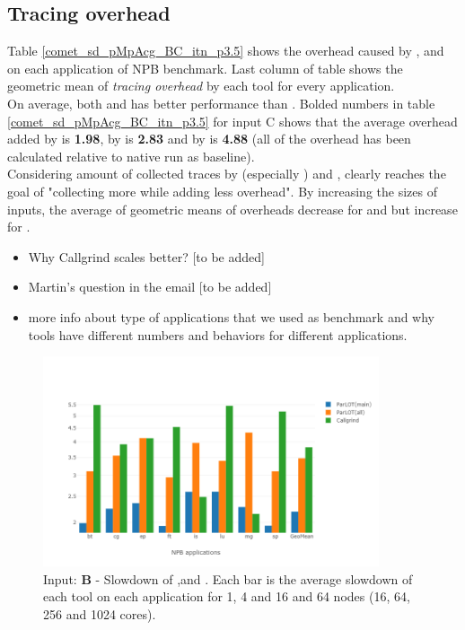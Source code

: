 

\subsection{Tracing overhead}
\label{subsec:lowtoh}

 

   
Table \ref{comet_sd_pMpAcg_BC_itn_p3.5} shows the overhead caused by \parlotm, \parlota and  \callgrind on each application of NPB benchmark.
Last column of table shows the geometric mean of \textit{tracing overhead} by each tool for every application. \\
 
 

On average, both \parlotm and \parlota has better performance than \callgrind. Bolded numbers in table \ref{comet_sd_pMpAcg_BC_itn_p3.5} for input C shows that the average overhead added by \parlotm is \textbf{1.98}, by \parlota is \textbf{2.83} and by \callgrind is \textbf{4.88} (all of the overhead has been calculated relative to native run as baseline). 
\\
Considering amount of collected traces by \parlot (especially \parlota) and \callgrind, clearly \parlot reaches the goal of "collecting more while adding less overhead".
By increasing the sizes of inputs, the average of geometric means of overheads decrease for \parlotm and \parlota but increase for \callgrind. 

\begin{itemize}
\item Why Callgrind scales better? [to be added]
\item Martin's question in the email [to be added]
\item more info about type of applications that we used as benchmark and why tools have different numbers and behaviors for different applications.
\end{itemize}
 
 
\begin{figure}[!t]
\centering
\includegraphics[width=3.9in]{figs.comet/comet_chartAvg_sd_B_p3_5.png}
\caption{ Input: \textbf{B} - Slowdown of \parlotm ,\parlota and \callgrind. Each bar is the average slowdown of each tool on each application for 1, 4 and 16 and 64 nodes (16, 64, 256 and 1024 cores). 
}
\label{comet_chartAvg_sd_B_p3_5}
\end{figure}


